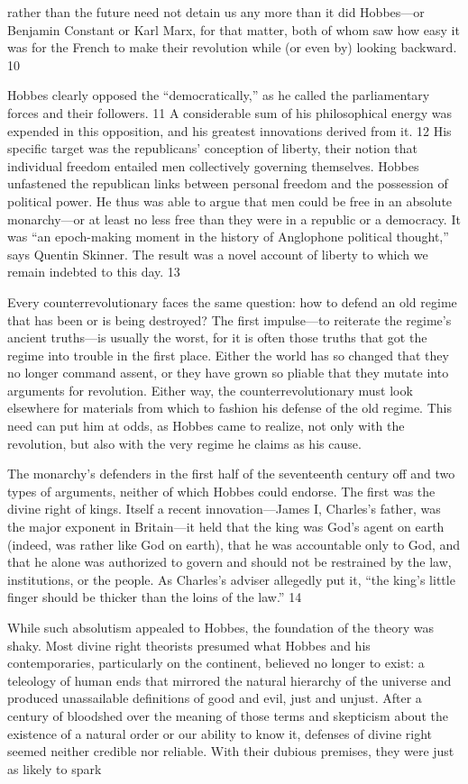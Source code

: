 rather than the future need not detain us any more than it did Hobbes—or Benjamin Constant or Karl Marx, for that matter, both of whom saw how easy it was for the French to make their revolution while (or even by) looking backward. {\color{blue} 10 } {\par} Hobbes clearly opposed the “democratically,” as he called the parliamentary forces and their followers. {\color{blue} 11 } A considerable sum of his philosophical energy was expended in this opposition, and his greatest innovations derived from it. {\color{blue} 12 } His specific target was the republicans’ conception of liberty, their notion that individual freedom entailed men collectively governing themselves. Hobbes unfastened the republican links between personal freedom and the possession of political power. He thus was able to argue that men could be free in an absolute monarchy—or at least no less free than they were in a republic or a democracy. It was “an epoch-making moment in the history of Anglophone political thought,” says Quentin Skinner. The result was a novel account of liberty to which we remain indebted to this day. {\color{blue} 13 } {\par} Every counterrevolutionary faces the same question: how to defend an old regime that has been or is being destroyed? The first impulse—to reiterate the regime’s ancient truths—is usually the worst, for it is often those truths that got the regime into trouble in the first place. Either the world has so changed that they no longer command assent, or they have grown so pliable that they mutate into arguments for revolution. Either way, the counterrevolutionary must look elsewhere for materials from which to fashion his defense of the old regime. This need can put him at odds, as Hobbes came to realize, not only with the revolution, but also with the very regime he claims as his cause.{\par} The monarchy’s defenders in the first half of the seventeenth century off and two types of arguments, neither of which Hobbes could endorse. The first was the divine right of kings. Itself a recent innovation—James I, Charles’s father, was the major exponent in Britain—it held that the king was God’s agent on earth (indeed, was rather like God on earth), that he was accountable only to God, and that he alone was authorized to govern and should not be restrained by the law, institutions, or the people. As Charles’s adviser allegedly put it, “the king’s little finger should be thicker than the loins of the law.” {\color{blue} 14 } {\par} While such absolutism appealed to Hobbes, the foundation of the theory was shaky. Most divine right theorists presumed what Hobbes and his contemporaries, particularly on the continent, believed no longer to exist: a teleology of human ends that mirrored the natural hierarchy of the universe and produced unassailable definitions of good and evil, just and unjust. After a century of bloodshed over the meaning of those terms and skepticism about the existence of a natural order or our ability to know it, defenses of divine right seemed neither credible nor reliable. With their dubious premises, they were just as likely to spark 